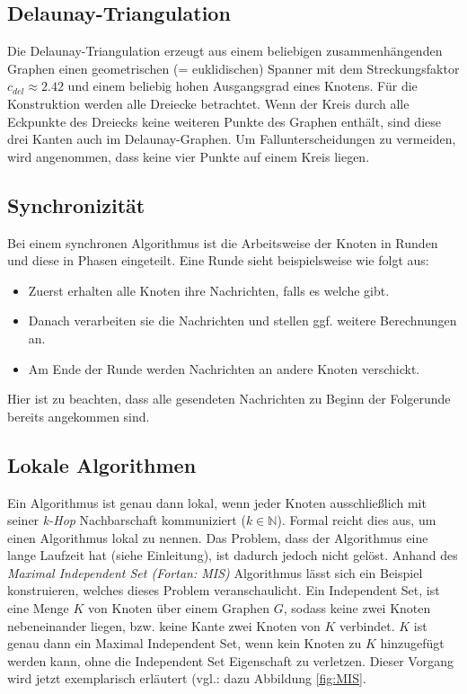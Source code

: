 \documentclass[a4paper,twoside]{IEEEtran}
\begin{document}
\subsection{Delaunay-Triangulation}
Die Delaunay-Triangulation erzeugt aus einem beliebigen zusammenhängenden Graphen einen geometrischen (= euklidischen) Spanner mit dem Streckungsfaktor $c_{del} \approx 2.42 $ und einem beliebig hohen Ausgangsgrad eines Knotens. 
Für die Konstruktion werden alle Dreiecke betrachtet.
Wenn der Kreis durch alle Eckpunkte des Dreiecks keine weiteren Punkte des Graphen enthält, sind diese drei Kanten auch im Delaunay-Graphen. 
Um Fallunterscheidungen zu vermeiden, wird angenommen, dass keine vier Punkte auf einem Kreis liegen. 



\subsection{Synchronizität}
Bei einem synchronen Algorithmus ist die Arbeitsweise der Knoten in Runden und diese in Phasen eingeteilt. 
Eine Runde sieht beispielsweise wie folgt aus:
\begin{itemize}
\item Zuerst erhalten alle Knoten ihre Nachrichten, falls es welche gibt.
\item Danach verarbeiten sie die Nachrichten und stellen ggf. weitere Berechnungen an.
\item Am Ende der Runde werden Nachrichten an andere Knoten verschickt.
\end{itemize}
Hier ist zu beachten, dass alle gesendeten Nachrichten zu Beginn der Folgerunde bereits angekommen sind.

\subsection{Lokale Algorithmen} \label{lokal}
Ein Algorithmus ist genau dann lokal, wenn jeder Knoten ausschließlich mit seiner \emph{k-Hop} Nachbarschaft kommuniziert ($k \in \mathds{N}$).
Formal reicht dies aus, um einen Algorithmus lokal zu nennen.
Das Problem, dass der Algorithmus eine lange Laufzeit hat (siehe Einleitung), ist dadurch jedoch nicht gelöst.
Anhand des \emph{Maximal Independent Set (Fortan: MIS)} Algorithmus lässt sich ein Beispiel konstruieren, welches dieses Problem veranschaulicht.
Ein Independent Set, ist eine Menge $K $ von Knoten über einem Graphen $G $, sodass keine zwei Knoten nebeneinander liegen, bzw. keine Kante zwei Knoten von $K $ verbindet.
$K $ ist genau dann ein Maximal Independent Set, wenn kein Knoten zu $K $ hinzugefügt werden kann, ohne die Independent Set Eigenschaft zu verletzen.
Dieser Vorgang wird jetzt exemplarisch erläutert
(vgl.: dazu Abbildung \ref{fig:MIS}.
\end{document}

